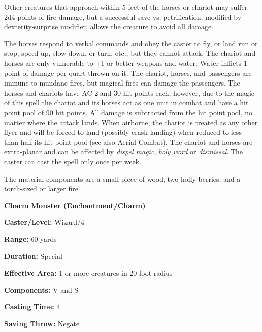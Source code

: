 \begin{multicols}{2}
Other creatures that approach within 5 feet of the horses or chariot may suffer 2d4 points of fire damage, but a successful save vs. petrification, modified by dexterity-surprise modifier, allows the creature to avoid all damage.

The horses respond to verbal commands and obey the caster to fly, or land run or stop, speed up, slow down, or turn, etc., but they cannot attack.  The chariot and horses are only vulnerable to +1 or better weapons and water. Water inflicts 1 point of damage per quart thrown on it.  The chariot, horses, and passengers are immune to mundane fires, but magical fires can damage the passengers.  The horses and chariots have AC 2 and 30 hit points each, however, due to the magic of this spell the chariot and its horses act as one unit in combat and have a hit point pool of 90 hit points.  All damage is subtracted from the hit point pool, no matter where the attack lands.  When airborne, the chariot is treated as any other flyer and will be forced to land (possibly crash landing) when reduced to less than half its hit point pool (see also Aerial Combat).  The chariot and horses are extra-planar and can be affected by \textit{dispel magic}, \textit{holy word} or \textit{dismissal}.  The caster can cast the spell only once per week.

The material components are a small piece of wood, two holly berries, and a torch-sized or larger fire.

\vspace{1em}

\noindent
\begin{minipage}{\columnwidth}

\noindent \textbf{Charm Monster (Enchantment/Charm)}

\noindent \textbf{Caster/Level:} Wizard/4

\noindent \textbf{Range:} 60 yards

\noindent \textbf{Duration:} Special

\noindent \textbf{Effective Area:} 1 or more creatures in 20-foot radius

\noindent \textbf{Components:} V and S

\noindent \textbf{Casting Time:} 4

\noindent \textbf{Saving Throw:} Negate

\end{minipage}


\end{multicols}
